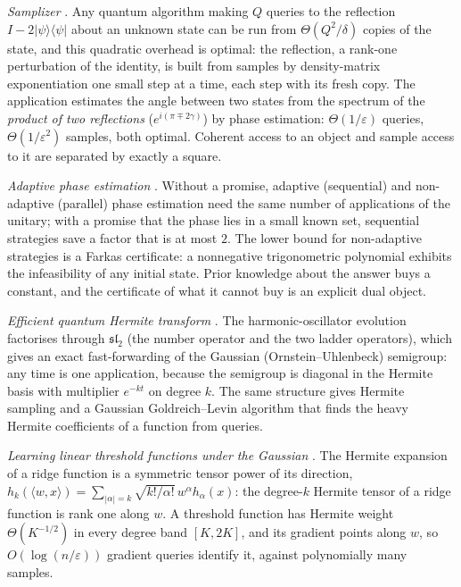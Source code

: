 \emph{Samplizer} \cite{WZ}. Any quantum algorithm making $Q$ queries to the reflection $I-2|\psi\rangle\langle\psi|$
about an unknown state can be run from $\Theta(Q^2/\delta)$ copies of the state, and this quadratic overhead is
optimal: the reflection, a rank-one perturbation of the identity, is built from samples by density-matrix
exponentiation one small step at a time, each step with its fresh copy. The application estimates the angle
between two states from the spectrum of the \emph{product of two reflections} ($e^{i(\pi\mp2\gamma)}$) by phase
estimation: $\Theta(1/\varepsilon)$ queries, $\Theta(1/\varepsilon^2)$ samples, both optimal. Coherent access to
an object and sample access to it are separated by exactly a square.

\emph{Adaptive phase estimation} \cite{LdW}. Without a promise, adaptive (sequential) and non-adaptive (parallel)
phase estimation need the same number of applications of the unitary; with a promise that the phase lies in a
small known set, sequential strategies save a factor that is at most $2$. The lower bound for non-adaptive
strategies is a Farkas certificate: a nonnegative trigonometric polynomial exhibits the infeasibility of any initial
state. Prior knowledge about the answer buys a constant, and the certificate of what it cannot buy is an explicit
dual object.

\emph{Efficient quantum Hermite transform} \cite{JISBJ}. The harmonic-oscillator evolution factorises through
$\mathfrak{sl}_2$ (the number operator and the two ladder operators), which gives an exact fast-forwarding of the
Gaussian (Ornstein--Uhlenbeck) semigroup: any time is one application, because the semigroup is diagonal in the
Hermite basis with multiplier $e^{-kt}$ on degree $k$. The same structure gives Hermite sampling and a Gaussian
Goldreich--Levin algorithm that finds the heavy Hermite coefficients of a function from queries.

\emph{Learning linear threshold functions under the Gaussian} \cite{KNdW}. The Hermite expansion of a ridge
function is a symmetric tensor power of its direction,
$h_k(\langle w,x\rangle)=\sum_{|\alpha|=k}\sqrt{k!/\alpha!}\,w^\alpha h_\alpha(x)$: the degree-$k$ Hermite
tensor of a ridge function is rank one along $w$. A threshold function has Hermite weight $\Theta(K^{-1/2})$ in
every degree band $[K,2K]$, and its gradient points along $w$, so $O(\log(n/\varepsilon))$ gradient queries
identify it, against polynomially many samples.

